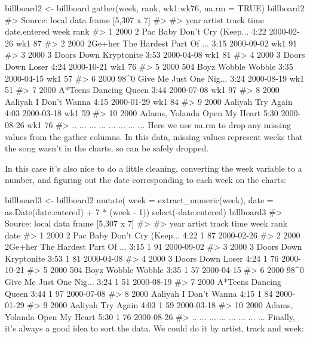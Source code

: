 billboard2 <- billboard %
  gather(week, rank, wk1:wk76, na.rm = TRUE)
billboard2
#> Source: local data frame [5,307 x 7]
#> 
#>    year         artist                   track time date.entered week rank
#> 1  2000          2 Pac Baby Don't Cry (Keep... 4:22   2000-02-26  wk1   87
#> 2  2000        2Ge+her The Hardest Part Of ... 3:15   2000-09-02  wk1   91
#> 3  2000   3 Doors Down              Kryptonite 3:53   2000-04-08  wk1   81
#> 4  2000   3 Doors Down                   Loser 4:24   2000-10-21  wk1   76
#> 5  2000       504 Boyz           Wobble Wobble 3:35   2000-04-15  wk1   57
#> 6  2000           98^0 Give Me Just One Nig... 3:24   2000-08-19  wk1   51
#> 7  2000        A*Teens           Dancing Queen 3:44   2000-07-08  wk1   97
#> 8  2000        Aaliyah           I Don't Wanna 4:15   2000-01-29  wk1   84
#> 9  2000        Aaliyah               Try Again 4:03   2000-03-18  wk1   59
#> 10 2000 Adams, Yolanda           Open My Heart 5:30   2000-08-26  wk1   76
#> ..  ...            ...                     ...  ...          ...  ...  ...
Here we use na.rm to drop any missing values from the gather columns. In this data, missing values represent weeks that the song wasn't in the charts, so can be safely dropped.

In this case it's also nice to do a little cleaning, converting the week variable to a number, and figuring out the date corresponding to each week on the charts:

billboard3 <- billboard2 %
  mutate(
    week = extract_numeric(week),
    date = as.Date(date.entered) + 7 * (week - 1)) %
  select(-date.entered)
billboard3
#> Source: local data frame [5,307 x 7]
#> 
#>    year         artist                   track time week rank       date
#> 1  2000          2 Pac Baby Don't Cry (Keep... 4:22    1   87 2000-02-26
#> 2  2000        2Ge+her The Hardest Part Of ... 3:15    1   91 2000-09-02
#> 3  2000   3 Doors Down              Kryptonite 3:53    1   81 2000-04-08
#> 4  2000   3 Doors Down                   Loser 4:24    1   76 2000-10-21
#> 5  2000       504 Boyz           Wobble Wobble 3:35    1   57 2000-04-15
#> 6  2000           98^0 Give Me Just One Nig... 3:24    1   51 2000-08-19
#> 7  2000        A*Teens           Dancing Queen 3:44    1   97 2000-07-08
#> 8  2000        Aaliyah           I Don't Wanna 4:15    1   84 2000-01-29
#> 9  2000        Aaliyah               Try Again 4:03    1   59 2000-03-18
#> 10 2000 Adams, Yolanda           Open My Heart 5:30    1   76 2000-08-26
#> ..  ...            ...                     ...  ...  ...  ...        ...
Finally, it's always a good idea to sort the data. We could do it by artist, track and week:

